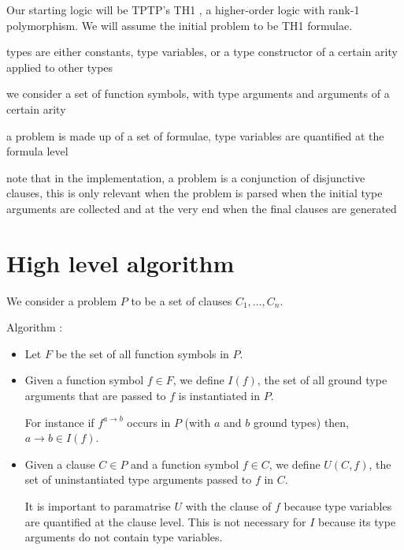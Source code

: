 \documentclass[]{ceurart}
\begin{document}
Our starting logic will be TPTP's TH1 \cite{th1}, a higher-order logic with rank-1 polymorphism. We will assume the initial problem to be TH1 formulae.

types are either constants, type variables, or a type constructor of a certain arity applied to other types

we consider a set of function symbols, with type arguments and arguments of a certain arity

a problem is made up of a set of formulae, type variables are quantified at the formula level

note that in the implementation, a problem is a conjunction of disjunctive clauses, this is only relevant when the problem is parsed when the initial type arguments are collected and at the very end when the final clauses are generated


\section{High level algorithm}
\label{sec:high-level-algorithm}

We consider a problem \(P\) to be a set of clauses \(C_1, \dots, C_n\).

Algorithm :
\begin{itemize}
    \item Let \(F\) be the set of all function symbols in \(P\).
    \item Given a function symbol \(f \in F\), we define \(I(f)\), the set of all ground type arguments that are passed to \(f\) is instantiated in \(P\).

    For instance if \(f^{a \rightarrow b}\) occurs in \(P\) (with \(a\) and \(b\) ground types) then, \(a \rightarrow b \in I(f) \).
 \item Given a clause \(C \in P\) and a function symbol \(f \in C\), we define \(U(C, f)\), the set of uninstantiated type arguments passed to \(f\) in \(C\). 

    It is important to paramatrise \(U\) with the clause of \(f\) because type variables are quantified at the clause level. This is not necessary for \(I\) because its type arguments do not contain type variables.

\end{itemize}
\end{document}
